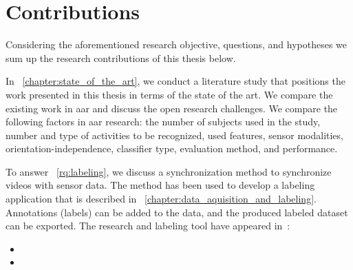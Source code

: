 \section{Contributions}
\label{sec:intro_contributions}

Considering the aforementioned research objective, questions, and hypotheses we sum up the research contributions of this thesis below.


In \chaptername~\ref{chapter:state_of_the_art}, we conduct a literature study that positions the work presented in this thesis in terms of the state of the art.
We compare the existing work in \gls{aar} and discuss the open research challenges.
We compare the following factors in \gls{aar} research: the number of subjects used in the study, number and type of activities to be recognized, used features, sensor modalities, orientation-independence, classifier type, evaluation method, and performance.
	


To answer \rqname~\ref{rq:labeling}, we discuss a synchronization method to synchronize videos with sensor data.
The method has been used to develop a labeling application that is described in \chaptername~\ref{chapter:data_aquisition_and_labeling}.
Annotations (labels) can be added to the data, and the produced labeled dataset can be exported.
The research and labeling tool have appeared in~\cite{Kamminga_2019_DATA_labeling_sync, Matlab_labeling_github}:

\begin{itemize}
\footnotesize
    \item[\cite{Kamminga_2019_DATA_labeling_sync}] 
    \item[\cite{Matlab_labeling_github}] 
\end{itemize}












